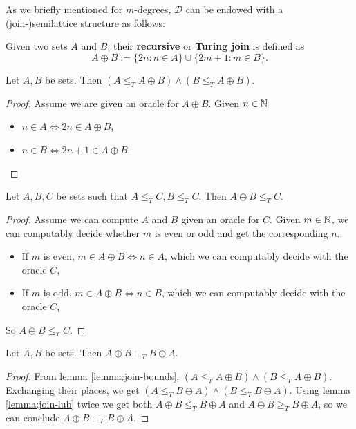\documentclass[../main.tex]{memoir}
\begin{document}
As we briefly mentioned for $m$-degrees, $\mathbf{\mathcal{D}}$ can be endowed with a (join-)semilattice structure as follows:

\begin{definition}
  Given two sets $A$ and $B$, their \textbf{recursive} or \textbf{Turing join} is defined as
  \[ A \oplus B := \{2n: n \in A\} \cup \{2m+1: m \in B\}. \]
\end{definition}

\begin{lemma}
  \label{lemma:join-bounds}
  Let $A, B$ be sets. Then $(A \le_T A \oplus B) \land (B \le_T A \oplus B)$.
\end{lemma}
\begin{proof}
  Assume we are given an oracle for $A \oplus B$. Given $n \in \mathbb{N}$
  \begin{itemize}
  \item $n \in A \iff 2n \in A \oplus B$,
  \item $n \in B \iff 2n + 1 \in A \oplus B$.
  \end{itemize}
\end{proof}

\begin{lemma}
  \label{lemma:join-lub}
  Let $A, B, C$ be sets such that $A \le_T C, B \le_T C$. Then $A \oplus B \le_T C$.
\end{lemma}
\begin{proof}
  Assume we can compute $A$ and $B$ given an oracle for $C$. Given $m \in \mathbb{N}$, we can computably decide whether $m$ is even or odd and get the corresponding $n$.
  \begin{itemize}
  \item If $m$ is even, $m \in A \oplus B \iff n \in A$, which we can computably decide with the oracle $C$,
  \item If $m$ is odd, $m \in A \oplus B \iff n \in B$, which we can computably decide with the oracle $C$,
  \end{itemize}
  So $A \oplus B \le_T C$.
\end{proof}

\begin{lemma}
  Let $A, B$ be sets. Then $A \oplus B \equiv_T B \oplus A$.
\end{lemma}
\begin{proof}
  From lemma \ref{lemma:join-bounds}, $(A \le_T A \oplus B) \land (B \le_T A \oplus B)$. Exchanging their places, we get $(A \le_T B \oplus A) \land (B \le_T B \oplus A)$.
  Using lemma \ref{lemma:join-lub} twice we get both $A \oplus B \le_T B \oplus A$ and $A \oplus B \ge_T B \oplus A$, so we can conclude $A \oplus B \equiv_T B \oplus A$.
\end{proof}
\end{document}
